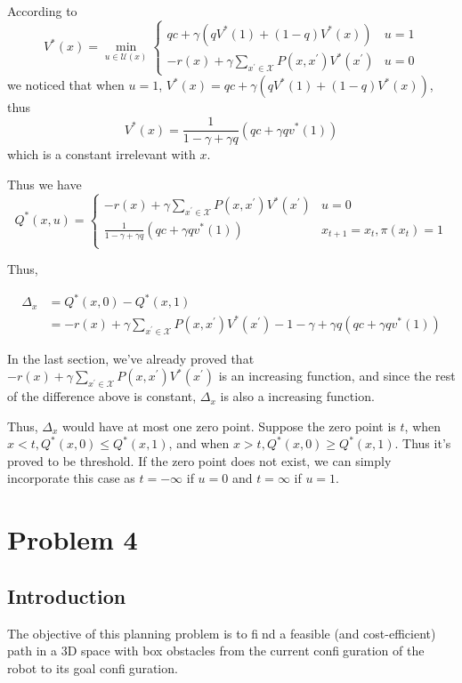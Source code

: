 \documentclass{article} %
\begin{document}
According to 
$$V^{*}(x)=\min _{u \in \mathcal{U}(x)} \left\{\begin{array}{ll}{q c+\gamma\left(q V^{*}(1)+(1-q) V^{*}(x)\right)} & {u=1} \\ {-r(x)+\gamma \sum_{x^{\prime} \in \mathcal{X}} P\left(x, x^{\prime}\right) V^{*}\left(x^{\prime}\right)} & {u=0}\end{array}\right.$$
we noticed that when $u=1$, $V^*(x) = q c+\gamma\left(q V^{*}(1)+(1-q) V^{*}(x)\right)$, thus $$V^*(x) = \frac{1}{1 - \gamma + \gamma q} (q c + \gamma q v^*(1))$$ which is a constant irrelevant with $x$. 

Thus we have $$Q^*(x, u) = 
\begin{cases}
    -r(x)+\gamma \sum_{x^{\prime} \in \mathcal{X}} P\left(x, x^{\prime}\right) V^{*}\left(x^{\prime}\right) & u=0\\
    \frac{1}{1 - \gamma + \gamma q} (q c + \gamma q v^*(1)) & x_{t+1}=x_t, \pi(x_t)=1 \\
\end{cases}$$

Thus, 

\begin{equation*}
    \begin{aligned}
        \Delta_x & = Q^*(x, 0) - Q^*(x, 1) \\
        &= -r(x)+\gamma \sum_{x^{\prime} \in \mathcal{X}} P\left(x, x^{\prime}\right) V^{*}\left(x^{\prime}\right) - {1 - \gamma + \gamma q} (q c + \gamma q v^*(1))
    \end{aligned}
\end{equation*}

In the last section, we've already proved that $-r(x)+\gamma \sum_{x^{\prime} \in \mathcal{X}} P\left(x, x^{\prime}\right) V^{*}\left(x^{\prime}\right)$ is an  increasing function, and since the rest of the difference above is constant, $\Delta_x$ is also a increasing function.

Thus, $\Delta_x$ would have at most one zero point. Suppose the zero point is $t$, when $x < t, Q^*(x, 0) \le Q^*(x, 1)$, and when $x > t, Q^*(x, 0) \ge Q^*(x, 1)$. Thus it's proved to be threshold. If the zero point does not exist, we can simply incorporate this case as $t=-\infty$ if $u=0$ and $t=\infty$ if $u=1$.

\section{Problem 4}

\subsection{Introduction}
The objective of this planning problem is to find a feasible (and cost-efficient) path in a 3D space with box obstacles from the current configuration of the robot to its goal configuration. 
\end{document}
